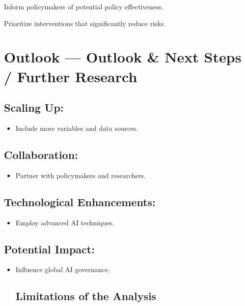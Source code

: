 \documentclass[
  letterpaper,
]{book}
\providecommand{\tightlist}{%
  \setlength{\itemsep}{0pt}\setlength{\parskip}{0pt}}
\begin{document}
Inform policymakers of potential policy effectiveness.

Prioritize interventions that significantly reduce risks.

\section{Outlook --- Outlook \& Next Steps / Further
Research}\label{outlook-outlook-next-steps-further-research}

\subsection{Scaling Up:}\label{scaling-up}

\begin{itemize}
\tightlist
\item
  Include more variables and data sources.
\end{itemize}

\subsection{Collaboration:}\label{collaboration}

\begin{itemize}
\tightlist
\item
  Partner with policymakers and researchers.
\end{itemize}

\subsection{Technological
Enhancements:}\label{technological-enhancements}

\begin{itemize}
\tightlist
\item
  Employ advanced AI techniques.
\end{itemize}

\subsection{Potential Impact:}\label{potential-impact}

\begin{itemize}
\item
  Influence global AI governance.

  \subsection{Limitations of the
  Analysis}\label{limitations-of-the-analysis}
\end{itemize}
\end{document}

